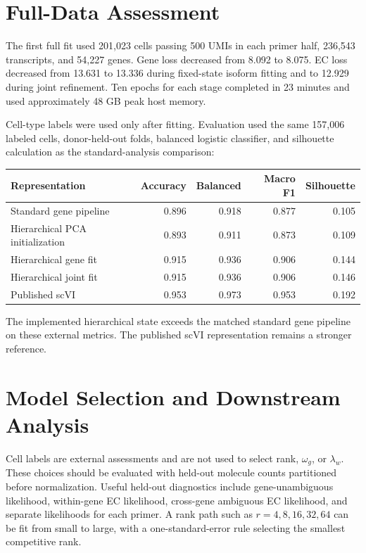 \documentclass[11pt]{article}
\begin{document}
\section*{Full-Data Assessment}

The first full fit used 201,023 cells passing 500 UMIs in each primer half,
236,543 transcripts, and 54,227 genes. Gene loss decreased from 8.092 to
8.075. EC loss decreased from 13.631 to 13.336 during fixed-state isoform
fitting and to 12.929 during joint refinement. Ten epochs for each stage
completed in 23 minutes and used approximately 48 GB peak host memory.

Cell-type labels were used only after fitting. Evaluation used the same
157,006 labeled cells, donor-held-out folds, balanced logistic classifier,
and silhouette calculation as the standard-analysis comparison:
\begin{center}
\begin{tabular}{lrrrr}
  \hline
  Representation & Accuracy & Balanced & Macro F1 & Silhouette \\
  \hline
  Standard gene pipeline & 0.896 & 0.918 & 0.877 & 0.105 \\
  Hierarchical PCA initialization & 0.893 & 0.911 & 0.873 & 0.109 \\
  Hierarchical gene fit & 0.915 & 0.936 & 0.906 & 0.144 \\
  Hierarchical joint fit & 0.915 & 0.936 & 0.906 & 0.146 \\
  Published scVI & 0.953 & 0.973 & 0.953 & 0.192 \\
  \hline
\end{tabular}
\end{center}
The implemented hierarchical state exceeds the matched standard gene
pipeline on these external metrics. The published scVI representation remains
a stronger reference.

\section*{Model Selection and Downstream Analysis}

Cell labels are external assessments and are not used to select rank,
\(\omega_g\), or \(\lambda_w\). These choices should be evaluated with
held-out molecule counts partitioned before normalization. Useful held-out
diagnostics include gene-unambiguous likelihood, within-gene EC likelihood,
cross-gene ambiguous EC likelihood, and separate likelihoods for each primer.
A rank path such as \(r=4,8,16,32,64\) can be fit from small to large, with a
one-standard-error rule selecting the smallest competitive rank.
\end{document}

